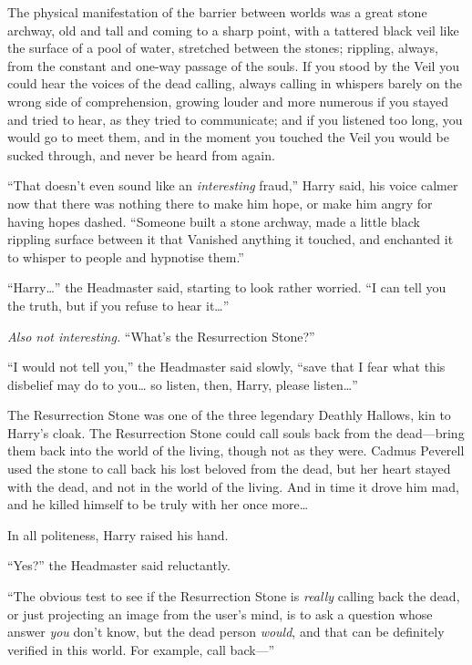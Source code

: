 The physical manifestation of the barrier between worlds was a great
stone archway, old and tall and coming to a sharp point, with a tattered
black veil like the surface of a pool of water, stretched between the
stones; rippling, always, from the constant and one-way passage of the
souls. If you stood by the Veil you could hear the voices of the dead
calling, always calling in whispers barely on the wrong side of
comprehension, growing louder and more numerous if you stayed and tried
to hear, as they tried to communicate; and if you listened too long, you
would go to meet them, and in the moment you touched the Veil you would
be sucked through, and never be heard from again.

``That doesn't even sound like an \emph{interesting} fraud,'' Harry
said, his voice calmer now that there was nothing there to make him
hope, or make him angry for having hopes dashed. ``Someone built a stone
archway, made a little black rippling surface between it that Vanished
anything it touched, and enchanted it to whisper to people and hypnotise
them.''

``Harry\ldots{}'' the Headmaster said, starting to look rather worried.
``I can tell you the truth, but if you refuse to hear it\ldots{}''

\emph{Also not interesting.} ``What's the Resurrection Stone?''

``I would not tell you,'' the Headmaster said slowly, ``save that I fear
what this disbelief may do to you\ldots{} so listen, then, Harry, please
listen\ldots{}''

The Resurrection Stone was one of the three legendary Deathly Hallows,
kin to Harry's cloak. The Resurrection Stone could call souls back from
the dead---bring them back into the world of the living, though not as
they were. Cadmus Peverell used the stone to call back his lost beloved
from the dead, but her heart stayed with the dead, and not in the world
of the living. And in time it drove him mad, and he killed himself to be
truly with her once more\ldots{}

In all politeness, Harry raised his hand.

``Yes?'' the Headmaster said reluctantly.

``The obvious test to see if the Resurrection Stone is \emph{really}
calling back the dead, or just projecting an image from the user's mind,
is to ask a question whose answer \emph{you} don't know, but the dead
person \emph{would}, and that can be definitely verified in this world.
For example, call back---''

